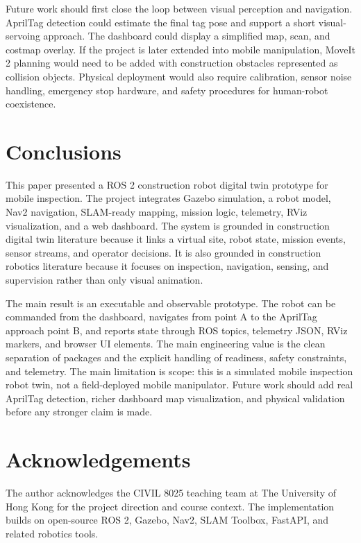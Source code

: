 \documentclass[12pt,a4paper]{article}
\begin{document}
Future work should first close the loop between visual perception and navigation. AprilTag detection could estimate the final tag pose and support a short visual-servoing approach. The dashboard could display a simplified map, scan, and costmap overlay. If the project is later extended into mobile manipulation, MoveIt 2 planning would need to be added with construction obstacles represented as collision objects. Physical deployment would also require calibration, sensor noise handling, emergency stop hardware, and safety procedures for human-robot coexistence.

\section{Conclusions}

This paper presented a ROS 2 construction robot digital twin prototype for mobile inspection. The project integrates Gazebo simulation, a robot model, Nav2 navigation, SLAM-ready mapping, mission logic, telemetry, RViz visualization, and a web dashboard. The system is grounded in construction digital twin literature because it links a virtual site, robot state, mission events, sensor streams, and operator decisions. It is also grounded in construction robotics literature because it focuses on inspection, navigation, sensing, and supervision rather than only visual animation.

The main result is an executable and observable prototype. The robot can be commanded from the dashboard, navigates from point A to the AprilTag approach point B, and reports state through ROS topics, telemetry JSON, RViz markers, and browser UI elements. The main engineering value is the clean separation of packages and the explicit handling of readiness, safety constraints, and telemetry. The main limitation is scope: this is a simulated mobile inspection robot twin, not a field-deployed mobile manipulator. Future work should add real AprilTag detection, richer dashboard map visualization, and physical validation before any stronger claim is made.

\section*{Acknowledgements}

The author acknowledges the CIVIL 8025 teaching team at The University of Hong Kong for the project direction and course context. The implementation builds on open-source ROS 2, Gazebo, Nav2, SLAM Toolbox, FastAPI, and related robotics tools.



\end{document}
